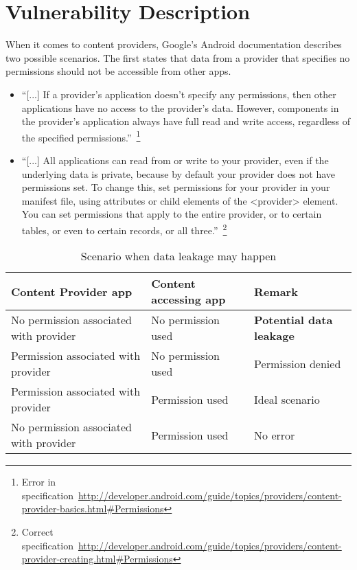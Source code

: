 \section{Vulnerability Description}
\label{vuln}
\noindent
When it comes to content providers, Google's Android documentation
describes two possible scenarios. The first states that data from
a provider
that specifies no permissions should not be accessible from other apps.
\begin{itemize}
 \item ``[...] If a provider's application doesn't specify any permissions, then other applications have no access to the provider's data. However, components in the provider's application always have full read and write access, regardless of the specified permissions.''~\footnote{Error in specification~\url{http://developer.android.com/guide/topics/providers/content-provider-basics.html#Permissions}}
 \item ``[...] All applications can read from or write to your provider, even if the underlying data is private, because by default your provider does not have permissions set. To change this, set permissions for your provider in your manifest file, using attributes or child elements of the <provider> element. You can set permissions that apply to the entire provider, or to certain tables, or even to certain records, or all three.''~\footnote{Correct specification~\url{http://developer.android.com/guide/topics/providers/content-provider-creating.html#Permissions}}
\end{itemize}
\begin{center}
	\begin{table}
		\label{tableErrors}
		\begin{tabular}{ | p{2.5cm} | p{2.5cm} | p{2cm} | }
			\hline
			\textbf{Content Provider app} & \textbf{Content accessing app} & \textbf{Remark} \\
			\hline \hline
			No permission associated with provider & No permission used & \textcolor[rgb]{1,0,0}{\textbf{Potential data leakage}} \\
			\hline
			Permission associated with provider & No permission used & Permission denied \\
			\hline
			Permission associated with provider & Permission used & Ideal scenario \\
			\hline
			No permission associated with provider & Permission used & No error \\
			\hline
		\end{tabular}
		\caption{Scenario when data leakage may happen}
	\end{table}
\end{center}
